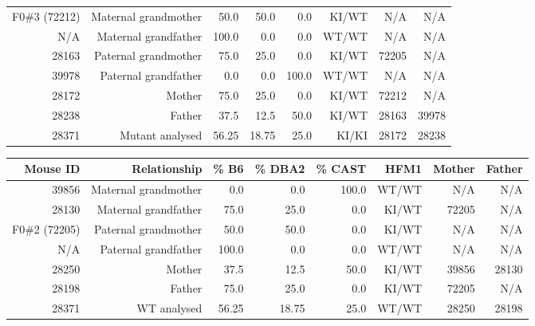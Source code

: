 \begin{table}[p]
\begin{subtable}[h]{\textwidth}
\begin{adjustbox}{width = 1\textwidth}
\begin{tabular}{rrrrrrrr}
				\midrule
				F0\#3 (72212)  & Maternal grandmother  & 50.0  & 50.0  & 0.0   & KI/WT & N/A    & N/A \\
				N/A      & Maternal grandfather  & 100.0 & 0.0   & 0.0   & WT/WT & N/A    & N/A \\
				28163   & Paternal grandmother  & 75.0  & 25.0  & 0.0   & KI/WT & 72205 & N/A \\
				39978   & Paternal grandfather  & 0.0   & 0.0   & 100.0 & WT/WT & N/A    & N/A \\
				\midrule
				28172   & Mother                & 75.0  & 25.0  & 0.0   & KI/WT & 72212 & N/A \\
				28238   & Father                & 37.5  & 12.5  & 50.0  & KI/WT & 28163 & 39978 \\
				\midrule
				28371   & Mutant analysed       & 56.25 & 18.75 & 25.0  & KI/KI & 28172 & 28238 \\
				\bottomrule

			\end{tabular}
		\end{adjustbox}
\label{tab:ancestry-28367}
	\end{subtable}
	\vspace{2cm}


	\begin{subtable}[h]{\textwidth}

		\centering
		\begin{adjustbox}{width = 1\textwidth}
			\begin{tabular}{rrrrrrrr}

				\toprule
				\textbf{Mouse ID} & \textbf{Relationship} & \textbf{\% B6} & \textbf{\% DBA2} & \textbf{\% CAST} & \textbf{HFM1} & \textbf{Mother} & \textbf{Father} \\

				\midrule
				39856   & Maternal grandmother  & 0.0   & 0.0   & 100.0 & WT/WT & N/A    & N/A \\
				28130   & Maternal grandfather  & 75.0  & 25.0  & 0.0   & KI/WT & 72205 & N/A \\
				F0\#2 (72205)  & Paternal grandmother  & 50.0  & 50.0  & 0.0   & KI/WT & N/A    & N/A \\
				N/A      & Paternal grandfather  & 100.0 & 0.0   & 0.0   & WT/WT & N/A    & N/A \\
				\midrule
				28250   & Mother                & 37.5  & 12.5  & 50.0  & KI/WT & 39856 & 28130 \\
				28198   & Father                & 75.0  & 25.0  & 0.0   & KI/WT & 72205 & N/A \\
				\midrule
				28371   & WT analysed           & 56.25 & 18.75 & 25.0  & WT/WT & 28250 & 28198 \\
				\toprule


\end{tabular}
\end{adjustbox}
\end{subtable}
\end{table}
